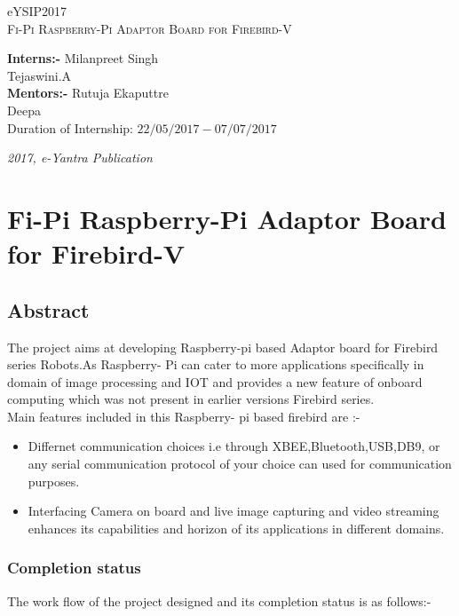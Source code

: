 \documentclass[a4paper,12pt,oneside]{book}
\begin{document}
\begin{titlepage}
\raggedright
{\Large eYSIP2017\\[1cm]}
{\Huge\scshape Fi-Pi Raspberry-Pi Adaptor Board for Firebird-V\\[.1in]}
\vfill
\begin{flushright}\textbf{Interns:-}
{\large Milanpreet Singh \\}
{\large Tejaswini.A \\}\textbf{Mentors:-}
{\large Rutuja Ekaputtre \\}
{\large Deepa  \\}
{\large Duration of Internship: $ 22/05/2017-07/07/2017 $ \\}
\end{flushright}

{\itshape 2017, e-Yantra Publication}
\end{titlepage}

\chapter[Project Tag]{Fi-Pi Raspberry-Pi Adaptor Board for Firebird-V}
\section*{Abstract}
The project aims at developing Raspberry-pi based Adaptor board for Firebird series Robots.As Raspberry- Pi can cater to more applications specifically in domain of image processing and IOT  and provides a new feature of onboard computing which was not present in earlier versions Firebird series.
\\Main features included in this Raspberry- pi based firebird are :-\\
\begin{itemize}
\item Differnet communication choices i.e through XBEE,Bluetooth,USB,DB9, or any serial communication protocol of your choice can used for communication purposes.
\item Interfacing Camera on board and live image capturing and video streaming enhances its capabilities and horizon of its applications in different domains.
\end{itemize}
\newpage
\subsection*{Completion status}
The work flow of the project designed and its completion status is as follows:-\\
\end{document}
